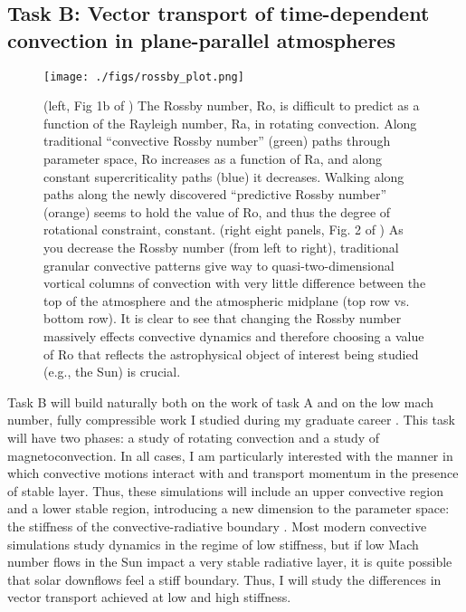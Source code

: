 \documentclass[aasms,12pt]{article}
\begin{document}
\subsection{Task B: Vector transport of time-dependent convection in plane-parallel atmospheres}
\begin{figure*}[t!]
    \texttt{[image: ./figs/rossby\_plot.png]}
    \caption{(left, Fig 1b of \citet{anders&all2019}) The Rossby number, Ro, is difficult to predict as a function of the Rayleigh number, Ra, in rotating convection.
	Along traditional ``convective Rossby number'' (green) paths through parameter space, Ro increases as a function of Ra, and along constant supercriticality paths (blue) it decreases.
	Walking along paths along the newly discovered ``predictive Rossby number'' (orange) seems to hold the value of Ro, and thus the degree of rotational constraint, constant.
	(right eight panels, Fig. 2 of \citet{anders&all2019}) As you decrease the Rossby number (from left to right), traditional granular convective patterns give way to quasi-two-dimensional vortical columns of convection with very little difference between the top of the atmosphere and the atmospheric midplane (top row vs. bottom row).
	It is clear to see that changing the Rossby number massively effects convective dynamics and therefore choosing a value of Ro that reflects the astrophysical object of interest being studied (e.g., the Sun) is crucial.
	\label{fig:rossby_plot} }
\end{figure*}


Task B will build naturally both on the work of task A and on the low mach number, fully compressible work I studied during my graduate career \citep{anders&brown2017, anders&all2019}.
This task will have two phases: a study of rotating convection and a study of magnetoconvection.
In all cases, I am particularly interested with the manner in which convective motions interact with and transport momentum in the presence of stable layer.
Thus, these simulations will include an upper convective region and a lower stable region, introducing a new dimension to the parameter space: the stiffness of the convective-radiative boundary \citep[or, whether or not convective motions can penetrate the stable region, as in][]{couston&all2017}.
Most modern convective simulations study dynamics in the regime of low stiffness, but if low Mach number flows in the Sun impact a very stable radiative layer, it is quite possible that solar downflows feel a stiff boundary.
Thus, I will study the differences in vector transport achieved at low and high stiffness.
\end{document}
